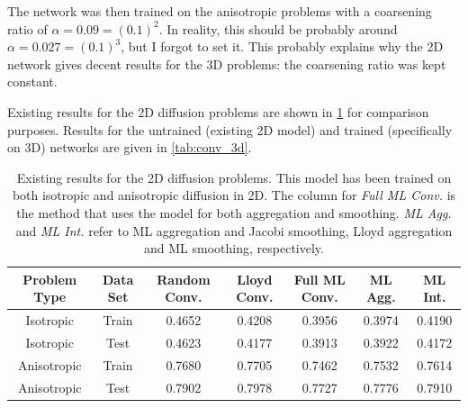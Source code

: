 \documentclass{article}
\begin{document}
The network was then trained on the anisotropic problems with a coarsening ratio of $\alpha=0.09=\left(0.1\right)^2$.  In reality, this should be probably around $\alpha=0.027=\left(0.1\right)^3$, but I forgot to set it.  This probably explains why the 2D network gives decent results for the 3D problems: the coarsening ratio was kept constant.

Existing results for the 2D diffusion problems are shown in \cref{tab:conv_2d} for comparison purposes.  Results for the untrained (existing 2D model) and trained (specifically on 3D) networks are given in \cref{tab:conv_3d}.

\begin{table}[h]
  \centering
  \begin{tabular}{c c c c c c c}
    \textbf{Problem Type} & \textbf{Data Set} & \textbf{Random Conv.} & \textbf{Lloyd Conv.} & \textbf{Full ML Conv.} & \textbf{ML Agg.} & \textbf{ML Int.} \\
    \hline
    Isotropic & Train & 0.4652 & 0.4208 & 0.3956 & 0.3974 & 0.4190 \\
    Isotropic & Test & 0.4623 & 0.4177 & 0.3913 & 0.3922 & 0.4172 \\
    Anisotropic & Train & 0.7680 & 0.7705 & 0.7462 & 0.7532 & 0.7614 \\
    Anisotropic & Test & 0.7902 & 0.7978 & 0.7727 & 0.7776 & 0.7910 \\
    \hline
  \end{tabular}
  \caption{Existing results for the 2D diffusion problems.  This model has been trained on both isotropic and anisotropic diffusion in 2D.  The column for \textit{Full ML Conv.} is the method that uses the model for both aggregation and smoothing.  \textit{ML Agg.} and \textit{ML Int.} refer to ML aggregation and Jacobi smoothing, Lloyd aggregation and ML smoothing, respectively.}
  \label{tab:conv_2d}
\end{table}
\end{document}

